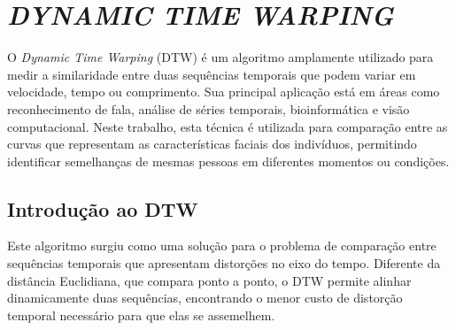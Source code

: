 \chapter{\textit{DYNAMIC TIME WARPING}} \label{cha:dtw}

O \textit{Dynamic Time Warping} (DTW) \cite{tavenard.blog.dtw} é um algoritmo amplamente utilizado para medir a similaridade entre duas sequências temporais que podem variar em velocidade, tempo ou comprimento. Sua principal aplicação está em áreas como reconhecimento de fala, análise de séries temporais, bioinformática e visão computacional. Neste trabalho, esta técnica é utilizada para comparação entre as curvas que representam as características faciais dos indivíduos, permitindo identificar semelhanças de mesmas pessoas em diferentes momentos ou condições.

\section{Introdução ao DTW}

Este algoritmo surgiu como uma solução para o problema de comparação entre sequências temporais que apresentam distorções no eixo do tempo. Diferente da distância Euclidiana, que compara ponto a ponto, o DTW permite alinhar dinamicamente duas sequências, encontrando o menor custo de distorção temporal necessário para que elas se assemelhem.



